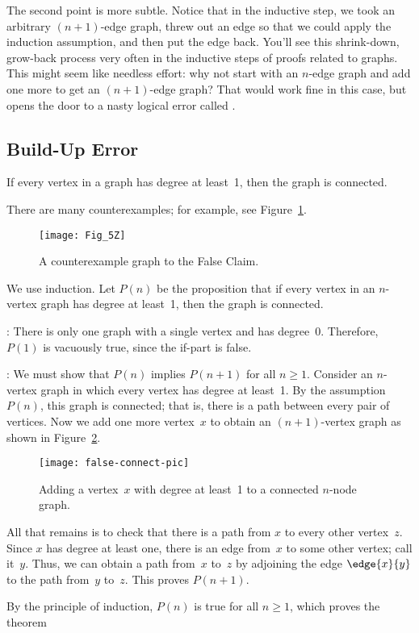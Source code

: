 The second point is more subtle.  Notice that in the inductive step,
we took an arbitrary $(n+1)$-edge graph, threw out an edge so that
we could apply the induction assumption, and then put the edge back.
You'll see this shrink-down, grow-back process very often in the
inductive steps of proofs related to graphs.  This might seem like
needless effort: why not start with an $n$-edge graph and add one
more to get an $(n+1)$-edge graph?  That would work fine in this
case, but opens the door to a nasty logical error called
.

\subsection{Build-Up Error}

\begin{falseclm*}
If every vertex in a graph has degree at least~1, then the graph is
connected.
\end{falseclm*}

There are many counterexamples; for example, see Figure~\ref{fig:5Z}.

\begin{figure}\redrawn

\texttt{[image: Fig\_5Z]}

\caption{A counterexample graph to the False Claim.}

\label{fig:5Z}
\end{figure}

\begin{falseproof}
We use induction.  Let $P(n)$ be the proposition that if every vertex
in an $n$-vertex graph has degree at least~1, then the graph is
connected.

: There is only one graph with a single
vertex and has degree~0.  Therefore, $P(1)$ is vacuously true, since
the if-part is false.

: We must show that $P(n)$ implies
$P(n+1)$ for all $n \ge 1$.  Consider an $n$-vertex graph in which
every vertex has degree at least~1.  By the assumption~$P(n)$, this
graph is connected; that is, there is a path between every pair of
vertices.  Now we add one more vertex~$x$ to obtain an $(n+1)$-vertex
graph as shown in Figure~\ref{fig:5Y}.

\begin{figure}\redrawn

\texttt{[image: false-connect-pic]}

\caption{Adding a vertex~$x$ with degree at least~1 to a connected
  $n$-node graph.}

\label{fig:5Y}

\end{figure}

All that remains is to check that there is a path from $x$ to every
other vertex~$z$.  Since $x$ has degree at least one, there is an edge
from~$x$ to some other vertex; call it~$y$.  Thus, we can obtain a
path from~$x$ to~$z$ by adjoining the edge $\edge{x}{y}$ to the path
from~$y$ to~$z$.  This proves $P(n + 1)$.

By the principle of induction, $P(n)$ is true for all  $n \ge 1$,
which proves the theorem
\end{falseproof}

